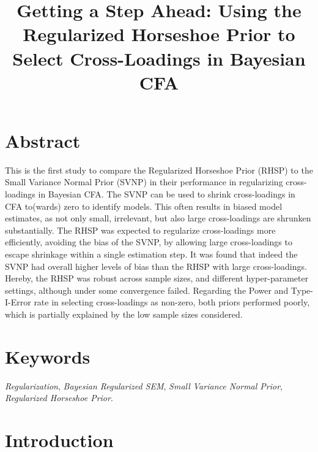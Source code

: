 \documentclass[
  man, donotrepeattitle,floatsintext]{apa6}
\title{Getting a Step Ahead: Using the Regularized Horseshoe Prior to Select Cross-Loadings in Bayesian CFA}
\author{\phantom{0}}
\date{}
\affiliation{\phantom{0}}
\begin{document}
\maketitle

\setcounter{page}{0}
\thispagestyle{empty}
\pagestyle{plain}

\clearpage

\hypertarget{abstract}{%
\section{Abstract}\label{abstract}}

This is the first study to compare the Regularized Horseshoe Prior (RHSP) to the Small Variance Normal Prior (SVNP) in their performance in regularizing cross-loadings in Bayesian CFA. The SVNP can be used to shrink cross-loadings in CFA to(wards) zero to identify models. This often results in biased model estimates, as not only small, irrelevant, but also large cross-loadings are shrunken substantially. The RHSP was expected to regularize cross-loadings more efficiently, avoiding the bias of the SVNP, by allowing large cross-loadings to escape shrinkage within a single estimation step. It was found that indeed the SVNP had overall higher levels of bias than the RHSP with large cross-loadings. Hereby, the RHSP was robust across sample sizes, and different hyper-parameter settings, although under some convergence failed. Regarding the Power and Type-I-Error rate in selecting cross-loadings as non-zero, both priors performed poorly, which is partially explained by the low sample sizes considered.

\vfill

\hypertarget{keywords}{%
\section{Keywords}\label{keywords}}

\emph{Regularization}, \emph{Bayesian Regularized SEM}, \emph{Small Variance Normal Prior}, \emph{Regularized Horseshoe Prior}.

\clearpage

\setcounter{secnumdepth}{5}

\hypertarget{introduction}{%
\section{Introduction}\label{introduction}}
\end{document}
